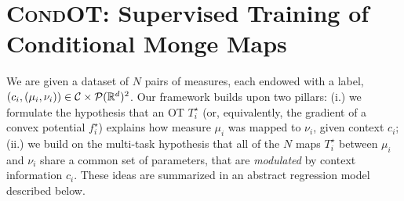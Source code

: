 \section{\textsc{CondOT}: Supervised Training of Conditional Monge Maps} \label{sec:method}
We are given a dataset of $N$ pairs of measures, each endowed with a label, $(c_i,(\mu_i, \nu_i))\in\mathcal{C}\times \mathcal{P}(\mathbb{R}^d)^2$. Our framework builds upon two pillars: (i.) we formulate the hypothesis that an \acrlong{OT} $T^\star_i$ (or, equivalently, the gradient of a convex potential $f^\star_i$) explains how measure $\mu_i$ was mapped to $\nu_i$, given context $c_i$; (ii.) we build on the multi-task hypothesis \citep{caruana1997multitask} that all of the $N$ maps $T^\star_i$ between $\mu_i$ and $\nu_i$ share a common set of parameters, that are \textit{modulated} by context information $c_i$. These ideas are summarized in an abstract regression model described below.

